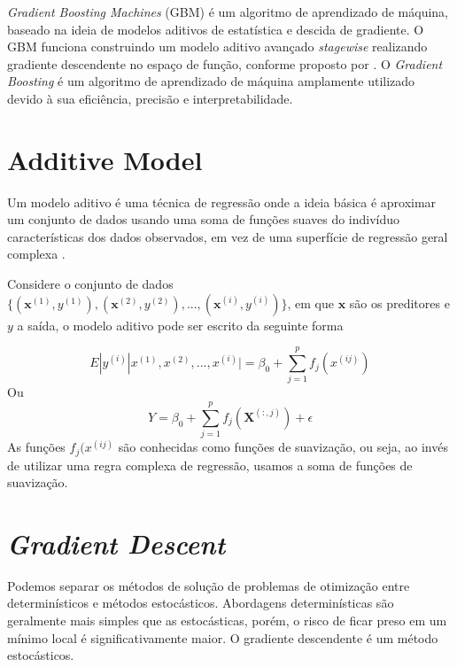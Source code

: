 \textit{Gradient Boosting Machines} (GBM) é um algoritmo de aprendizado de máquina, baseado na ideia de modelos aditivos de estatística e descida de gradiente. O GBM funciona construindo um modelo aditivo avançado \textit{stagewise} realizando gradiente descendente no espaço de função, conforme proposto por \cite{greedy}. O \textit{Gradient Boosting} é um algoritmo de aprendizado de máquina amplamente utilizado devido à sua eficiência, precisão e interpretabilidade.
\section{Additive Model}
Um modelo aditivo é uma técnica de regressão onde a ideia básica é aproximar um conjunto de dados usando uma soma de funções suaves do indivíduo características dos dados observados, em vez de uma superfície de regressão geral complexa \cite{persu:regre}.

Considere o conjunto de dados $\{(\mathbf{x}^{(1)},y^{(1)}),(\mathbf{x}^{(2)},y^{(2)}),...,(\mathbf{x}^{(i)},y^{(i)})\}$, em que $\mathbf{x}$ são os preditores e $y$ a saída, o modelo aditivo pode ser escrito da seguinte forma

\begin{equation}
    E|y^{(i)}|x^{(1)},x^{(2)},...,x^{(i)}| = \beta_0 + \sum_{j=1}^pf_j(x^{(ij)})
\end{equation}
Ou
\begin{equation}
    Y = \beta_0 + \sum_{j=1}^pf_j(\mathbf{X}^{(:,j)}) + \epsilon
\end{equation}
As funções $f_j(x^{(ij)}$ são conhecidas como funções de suavização, ou seja, ao invés de utilizar uma regra complexa de regressão, usamos a soma de funções de suavização.

\section{\textit{Gradient Descent}}
Podemos separar os métodos de solução de problemas de otimização entre determinísticos e métodos estocásticos. Abordagens determinísticas são geralmente mais simples que as estocásticas, porém, o risco de ficar preso em um mínimo local é significativamente maior. O gradiente descendente é um método estocásticos.

